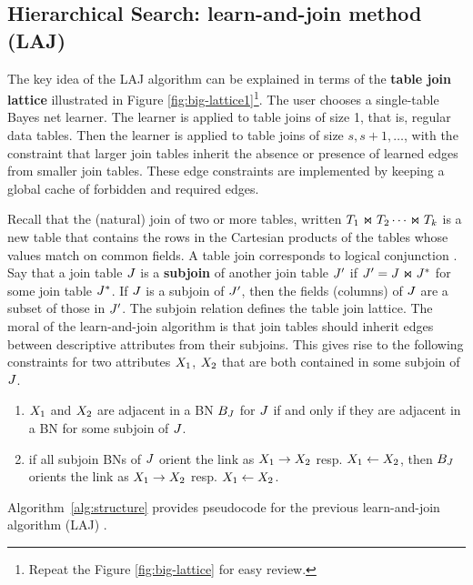 \documentclass{sfuthesis}
\begin{document}
\subsection{Hierarchical Search: learn-and-join method (LAJ)}\label{sec:laj}
The key idea of the LAJ algorithm can be explained in terms of the \textbf{table join lattice} illustrated in Figure \ref{fig:big-lattice1}\footnote{Repeat the Figure \ref{fig:big-lattice} for easy review.}. 
The user chooses a single-table Bayes net learner. The learner is applied to table joins of size 1, that is, regular data tables. Then the learner is applied to table joins of size $s,s+1,\ldots$, with the constraint that larger join tables inherit the absence or presence of learned edges from smaller join tables. These edge constraints are implemented by keeping a global cache of forbidden and required edges.  


Recall that the (natural) join of two or more tables, written $T_{1} \Join T_{2} \cdots \Join T_{k}$ is a new table that contains the rows in the Cartesian products of the tables whose values match on common fields. A table join corresponds to logical conjunction \cite{Ullman1982}.
Say that a join table $J$ is a \textbf{subjoin} of another join table $J'$ if $J' = J \Join J^{*}$ for some join table $J^{*}$. If $J$ is a subjoin of $J'$, then the fields (columns) of $J$ are a subset of those in $J'$. The subjoin relation defines the table join lattice. 
The moral of the learn-and-join algorithm is that join tables should inherit edges between descriptive attributes from their subjoins. This gives rise to the following constraints for two attributes $X_{1}$, $X_{2}$ that are both contained in some subjoin of $J$. 
\begin{enumerate}
\item $X_{1}$ and $X_{2}$ are adjacent in a BN $B_{J}$ for $J$ if and only if they are adjacent in a BN for some subjoin of $J$. 
\item if all subjoin BNs of $J$ orient the link as $X_{1}\rightarrow X_{2}$ resp. $X_{1}\leftarrow X_{2}$, then $B_{J}$ orients the link as $X_{1}\rightarrow X_{2}$ resp. $X_{1}\leftarrow X_{2}$.
\end{enumerate}
Algorithm~\ref{alg:structure} provides pseudocode for the previous learn-and-join algorithm (LAJ) \cite{Schulte2012c}.
\end{document}
